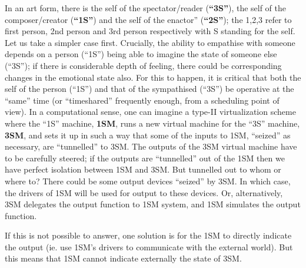 In an art form, there is the self of the spectator/reader (\textbf{“3S”}), the self of the composer/creator (\textbf{“1S”}) and the self of the enactor” (\textbf{“2S”}); the 1,2,3 refer to first person, 2nd person and 3rd person respectively with S standing for the self. Let us take a simpler case first. Crucially, the ability to empathise with someone depends on a person (“1S”) being able to imagine the state of someone else (“3S”); if there is considerable depth of feeling, there could be corresponding changes in the emotional state also. For this to happen, it is critical that both the self of the person (“1S”) and that of the sympathised (“3S”) be operative at the “same” time (or “timeshared” frequently enough, from a scheduling point of view). In a computational sense, one can imagine a type-II virtualization scheme where the “1S” machine, \textbf{1SM}, runs a new virtual machine for the “3S” machine, \textbf{3SM}, and sets it up in such a way that some of the inputs to 1SM, “seized” as necessary, are “tunnelled” to 3SM. The outputs of the 3SM virtual machine have to be carefully steered; if the outputs are “tunnelled” out of the 1SM then we have perfect isolation between 1SM and 3SM. But tunnelled out to whom or where to? There could be some output devices “seized” by 3SM. In which case, the drivers of 1SM will be used for output to these devices. Or, alternatively, 3SM delegates the output function to 1SM system, and 1SM simulates the output function.

If this is not possible to answer, one solution is for the 1SM to directly indicate the output (ie. use 1SM’s drivers to communicate with the external world). But this means that 1SM cannot indicate externally the state of 3SM. 


